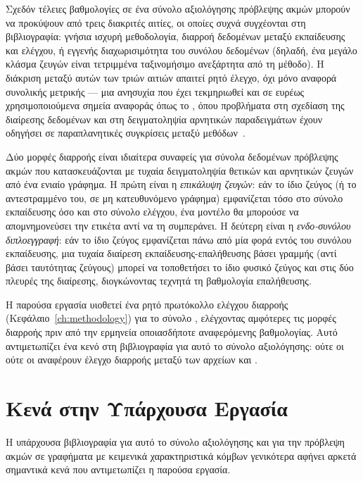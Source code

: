 Σχεδόν τέλειες βαθμολογίες σε ένα σύνολο αξιολόγησης πρόβλεψης ακμών μπορούν να
προκύψουν από τρεις διακριτές αιτίες, οι οποίες συχνά συγχέονται στη βιβλιογραφία:
γνήσια ισχυρή μεθοδολογία, διαρροή δεδομένων μεταξύ εκπαίδευσης και ελέγχου, ή
εγγενής διαχωρισιμότητα του συνόλου δεδομένων (δηλαδή, ένα μεγάλο κλάσμα ζευγών
είναι τετριμμένα ταξινομήσιμο ανεξάρτητα από τη μέθοδο).
Η διάκριση μεταξύ αυτών
των τριών αιτιών απαιτεί ρητό έλεγχο, όχι μόνο αναφορά συνολικής μετρικής — μια
ανησυχία που έχει τεκμηριωθεί και σε ευρέως χρησιμοποιούμενα σημεία αναφοράς όπως
το , όπου προβλήματα στη σχεδίαση της διαίρεσης δεδομένων και στη
δειγματοληψία αρνητικών παραδειγμάτων έχουν οδηγήσει σε παραπλανητικές συγκρίσεις
μεταξύ μεθόδων~\cite{li2023evaluating}.

Δύο μορφές διαρροής είναι ιδιαίτερα συναφείς για σύνολα δεδομένων πρόβλεψης ακμών
που κατασκευάζονται με τυχαία δειγματοληψία θετικών και αρνητικών ζευγών από ένα
ενιαίο γράφημα.
Η πρώτη είναι η \textit{επικάλυψη ζευγών}: εάν το ίδιο ζεύγος (ή το
αντεστραμμένο του, σε μη κατευθυνόμενο γράφημα) εμφανίζεται τόσο στο σύνολο
εκπαίδευσης όσο και στο σύνολο ελέγχου, ένα μοντέλο θα μπορούσε να απομνημονεύσει
την ετικέτα αντί να τη συμπεράνει.
Η δεύτερη είναι η \textit{ενδο-συνόλου
διπλοεγγραφή}: εάν το ίδιο ζεύγος εμφανίζεται πάνω από μία φορά εντός του συνόλου
εκπαίδευσης, μια τυχαία διαίρεση εκπαίδευσης-επαλήθευσης βάσει γραμμής (αντί βάσει
ταυτότητας ζεύγους) μπορεί να τοποθετήσει το ίδιο φυσικό ζεύγος και στις δύο
πλευρές της διαίρεσης, διογκώνοντας τεχνητά τη βαθμολογία επαλήθευσης.

Η παρούσα εργασία υιοθετεί ένα ρητό πρωτόκολλο ελέγχου διαρροής (Κεφάλαιο~\ref{ch:methodology})
για το σύνολο , ελέγχοντας αμφότερες τις
μορφές διαρροής πριν από την ερμηνεία οποιασδήποτε αναφερόμενης βαθμολογίας.
Αυτό αντιμετωπίζει ένα κενό στη βιβλιογραφία για αυτό το σύνολο αξιολόγησης: ούτε
οι \textcite{phan2023link} ούτε οι \textcite{tran2023text} αναφέρουν
έλεγχο διαρροής μεταξύ των αρχείων \texttt{} και
\texttt{}.


\section{Κενά στην Υπάρχουσα Εργασία}
\label{sec:gaps}

Η υπάρχουσα βιβλιογραφία για αυτό το σύνολο αξιολόγησης και για την πρόβλεψη ακμών
σε γραφήματα με κειμενικά χαρακτηριστικά κόμβων γενικότερα αφήνει αρκετά σημαντικά
κενά που αντιμετωπίζει η παρούσα εργασία.

